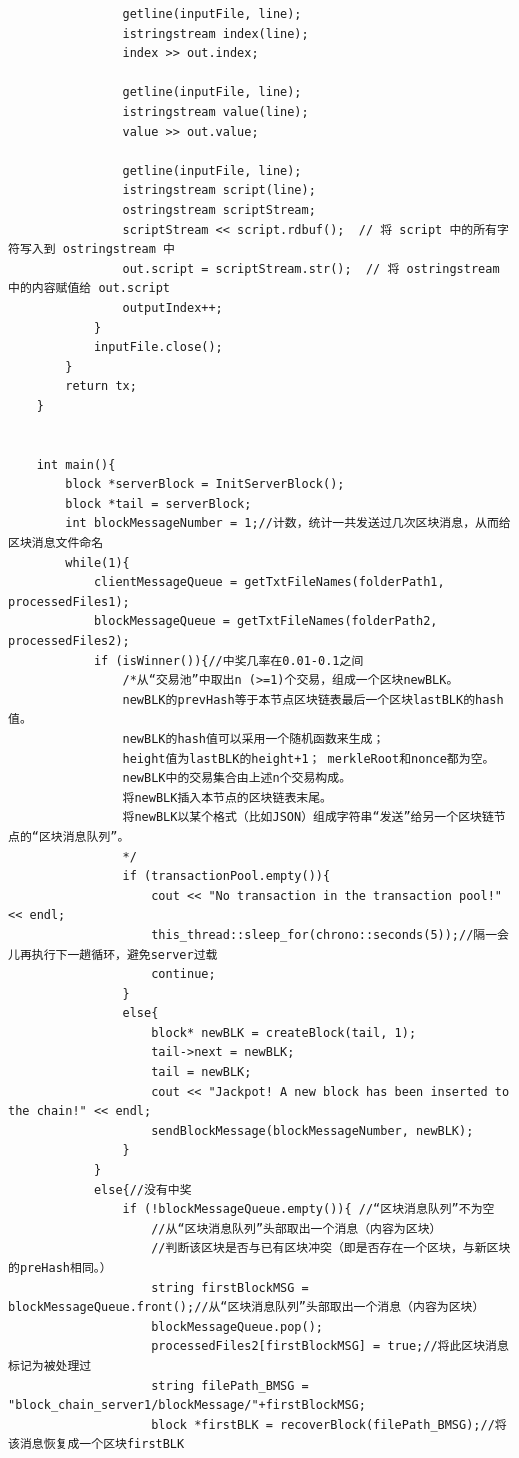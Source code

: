 \documentclass[10pt,a4paper]{article}
\begin{document}
\begin{verbatim}
                getline(inputFile, line);
                istringstream index(line);
                index >> out.index;
    
                getline(inputFile, line);
                istringstream value(line);
                value >> out.value;
    
                getline(inputFile, line);
                istringstream script(line);
                ostringstream scriptStream;
                scriptStream << script.rdbuf();  // 将 script 中的所有字符写入到 ostringstream 中
                out.script = scriptStream.str();  // 将 ostringstream 中的内容赋值给 out.script
                outputIndex++;
            }
            inputFile.close();
        }
        return tx;
    }
    
    
    int main(){
        block *serverBlock = InitServerBlock();
        block *tail = serverBlock;
        int blockMessageNumber = 1;//计数，统计一共发送过几次区块消息，从而给区块消息文件命名
        while(1){
            clientMessageQueue = getTxtFileNames(folderPath1, processedFiles1);
            blockMessageQueue = getTxtFileNames(folderPath2, processedFiles2);
            if (isWinner()){//中奖几率在0.01-0.1之间
                /*从“交易池”中取出n (>=1)个交易，组成一个区块newBLK。
                newBLK的prevHash等于本节点区块链表最后一个区块lastBLK的hash值。
                newBLK的hash值可以采用一个随机函数来生成；
                height值为lastBLK的height+1； merkleRoot和nonce都为空。
                newBLK中的交易集合由上述n个交易构成。
                将newBLK插入本节点的区块链表末尾。
                将newBLK以某个格式（比如JSON）组成字符串“发送”给另一个区块链节点的“区块消息队列”。
                */
                if (transactionPool.empty()){
                    cout << "No transaction in the transaction pool!" << endl;
                    this_thread::sleep_for(chrono::seconds(5));//隔一会儿再执行下一趟循环，避免server过载
                    continue;
                }
                else{
                    block* newBLK = createBlock(tail, 1);
                    tail->next = newBLK;
                    tail = newBLK;
                    cout << "Jackpot! A new block has been inserted to the chain!" << endl;
                    sendBlockMessage(blockMessageNumber, newBLK);
                }
            }
            else{//没有中奖
                if (!blockMessageQueue.empty()){ //“区块消息队列”不为空
                    //从“区块消息队列”头部取出一个消息（内容为区块）
                    //判断该区块是否与已有区块冲突（即是否存在一个区块，与新区块的preHash相同。）
                    string firstBlockMSG = blockMessageQueue.front();//从“区块消息队列”头部取出一个消息（内容为区块）
                    blockMessageQueue.pop();
                    processedFiles2[firstBlockMSG] = true;//将此区块消息标记为被处理过
                    string filePath_BMSG = "block_chain_server1/blockMessage/"+firstBlockMSG;
                    block *firstBLK = recoverBlock(filePath_BMSG);//将该消息恢复成一个区块firstBLK
    

\end{verbatim}
\end{document}
